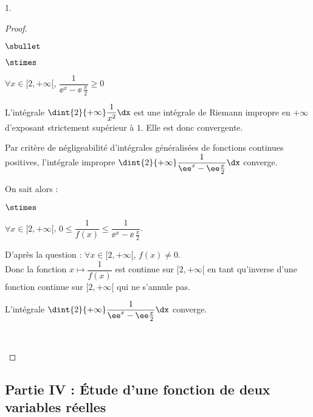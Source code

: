 \documentclass[11pt]{article}%
\begin{document}
\begin{noliste}{1.}
\begin{proof}
\begin{noliste}{$\sbullet$}
\begin{noliste}{$\stimes$}
  \item $\forall x\in [2,+\infty[$, $\dfrac{1}{\ee^x-\ee \, \frac{x}{2}}
  \geq 0$
  
  \item L'intégrale $\dint{2}{+\infty} \dfrac{1}{x^2}\dx$ est une 
  intégrale de Riemann impropre en $+\infty$ d'exposant strictement 
  supérieur à $1$. Elle est donc convergente.
\end{noliste}
Par critère de négligeabilité d'intégrales généralisées de fonctions
continues positives, l'intégrale impropre $\dint{2}{+\infty}
\dfrac{1}{\ee^x-\ee \frac{x}{2}} \dx$ converge.

\item On sait alors :
\begin{noliste}{$\stimes$}
  \item $\forall x\in [2,+\infty[$, $0\leq \dfrac{1}{f(x)}\leq 
  \dfrac{1}{\ee^x-\ee \, \frac{x}{2}}$.
  \item D'après la question  : $\forall x\in 
  [2,+\infty[$, $f(x)\neq 0$.\\[.2cm]
  Donc la fonction $x\mapsto \dfrac{1}{f(x)}$ est continue sur 
  $[2,+\infty[$ en tant qu'inverse d'une fonction continue
  sur $[2,+\infty[$ qui ne 
  s'annule pas.
  \item L'intégrale $\dint{2}{+\infty} 
  \dfrac{1}{\ee^x-\ee \frac{x}{2}} \dx$ converge.
  \end{noliste}

~\\[-1.4cm]
\end{noliste}
\end{proof}
\end{noliste}


\subsection*{Partie IV : Étude d'une fonction de deux variables
  réelles}
\end{document}
